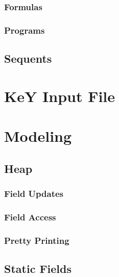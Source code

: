 \documentclass[a4paper, 11pt, accentcolor = tud3b]{tudreport}
\begin{document}
				\subsubsection{Formulas} %

				\subsubsection{Programs} %

			\subsection{Sequents} %

		\section{KeY Input File} %

		\section{Modeling} %

			\subsection{Heap} %

				\subsubsection{Field Updates} %

				\subsubsection{Field Access} %

				\subsubsection{Pretty Printing} %

			\subsection{Static Fields} %
\end{document}
